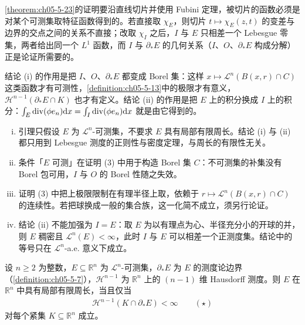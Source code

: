 \documentclass[../../main.tex]{subfiles}%
\begin{document}
\begin{remark}\label{remark:ch05-lem-5-9-动机}
\cref{theorem:ch05-5-23}的证明要沿直线切片并使用 Fubini 定理，被切片的函数必须是对某个可测集取特征函数得到的。若直接取 $\chi_E$，则切片 $t\mapsto\chi_E(z,t)$ 的变差与边界的交点之间的关系不直接；改取 $\chi_I$ 之后，$I$ 与 $E$ 只相差一个 Lebesgue 零集，两者给出同一个 $L^1$ 函数，而 $I$ 与 $\partial_*E$ 的几何关系（$I$、$O$、$\partial_*E$ 构成分解）正是论证所需要的。%

结论 (i) 的作用是把 $I$、$O$、$\partial_*E$ 都变成 Borel 集：这样 $x\mapsto\mathcal{L}^n(B(x,r)\cap C)$ 这类函数才有可测性，\cref{definition:ch05-5-13}中的极限才有意义，$\mathcal{H}^{n-1}(\partial_*E\cap K)$ 也才有定义。结论 (ii) 的作用是把 $E$ 上的积分换成 $I$ 上的积分：$\int_E\operatorname{div}(\phi e_n)\mathrm{d} x=\int_I\operatorname{div}(\phi e_n)\mathrm{d} x$ 就是由它得到的。 %
\end{remark}

\begin{remark}\label{remark:ch05-lem-5-9-条件}
\begin{enumerate}[(i)]
\item 引理只假设 $E$ 为 $\mathcal{L}^n$-可测集，不要求 $E$ 具有局部有限周长。结论 (i) 与 (ii) 都只用到 Lebesgue 测度的正则性与密度定理，与周长的有限性无关。
\item 条件「$E$ 可测」在证明 (3) 中用于构造 Borel 集 $C$：不可测集的补集没有 Borel 包可用，$I$ 与 $O$ 的 Borel 性随之失效。
\item 证明 (3) 中把上极限限制在有理半径上取，依赖于 $r\mapsto\mathcal{L}^n(B(x,r)\cap C)$ 的连续性。若把球换成一般的集合族，这一化简不成立，须另行论证。
\item 结论 (ii) 不能加强为 $I=E$：取 $E$ 为以有理点为心、半径充分小的开球的并，则 $E$ 稠密且 $\mathcal{L}^n(E)<\infty$，此时 $I$ 与 $E$ 可以相差一个正测度集。结论中的等号只在 $\mathcal{L}^n$-a.e. 意义下成立。
\end{enumerate}
\end{remark}
\begin{theorem}[有限周长的判别准则]\label{theorem:ch05-5-23}
设 $n\geqslant2$ 为整数，$E\subseteq\mathbb{R}^n$ 为 $\mathcal{L}^n$-可测集，$\partial_*E$ 为 $E$ 的测度论边界（\cref{definition:ch05-5-7}），$\mathcal{H}^{n-1}$ 为 $\mathbb{R}^n$ 上的 $(n-1)$ 维 Hausdorff 测度。则 $E$ 在 $\mathbb{R}^n$ 中具有局部有限周长，当且仅当 %
\begin{align*}
\mathcal{H}^{n-1}(K\cap\partial_*E)<\infty\qquad(\star)
\end{align*}
对每个紧集 $K\subseteq\mathbb{R}^n$ 成立。
\end{theorem}
\end{document}
